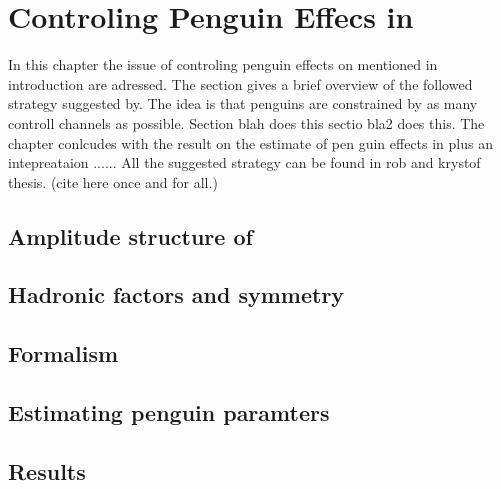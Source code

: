 
\chapter{Controling Penguin Effecs in \phis}
\label{Penguins}

In this chapter the issue of controling penguin effects on \phis mentioned in introduction are adressed.
The section gives a brief overview of the followed strategy suggested by.
The idea is that penguins are constrained by as many controll channels as possible.
Section blah does this sectio bla2 does this. The chapter conlcudes with the result on the estimate of pen guin effects in \phis
plus an intepreataion ......
All the suggested strategy can be found in rob and krystof thesis. (cite here once and for all.)

\section{Amplitude structure of \BsJpsiPhi}
\label{jpsiphi_amp_struct}


\section{Hadronic factors and \grpsuthree symmetry}
\label{had_pars_suthree}


\section{Formalism}
\label{penguin_formalism}


\section{Estimating penguin paramters}
\label{penguin_more_chanells}


\section{Results}
\label{penguin_results}


